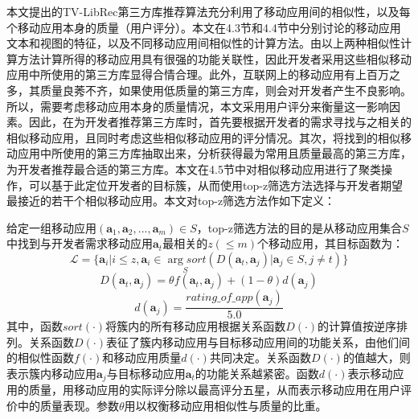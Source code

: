 本文提出的TV-LibRec第三方库推荐算法充分利用了移动应用间的相似性，以及每个移动应用本身的质量（用户评分）。本文在4.3节和4.4节中分别讨论的移动应用文本和视图的特征，以及不同移动应用间相似性的计算方法。由以上两种相似性计算方法计算所得的移动应用具有很强的功能关联性，因此开发者采用这些相似移动应用中所使用的第三方库显得合情合理。此外，互联网上的移动应用有上百万之多，其质量良莠不齐，如果使用低质量的第三方库，则会对开发者产生不良影响。所以，需要考虑移动应用本身的质量情况，本文采用用户评分来衡量这一影响因素。因此，在为开发者推荐第三方库时，首先要根据开发者的需求寻找与之相关的相似移动应用，且同时考虑这些相似移动应用的评分情况。其次，将找到的相似移动应用中所使用的第三方库抽取出来，分析获得最为常用且质量最高的第三方库，为开发者推荐最合适的第三方库。本文在4.5节中对相似移动应用进行了聚类操作，可以基于此定位开发者的目标簇，从而使用top-z筛选方法选择与开发者期望最接近的若干个相似移动应用。本文对top-z筛选方法作如下定义：
\begin{definition}
给定一组移动应用$(\mathbf{a}_1, \mathbf{a}_2, ..., \mathbf{a}_m) \in S$，top-z筛选方法的目的是从移动应用集合$S$中找到与开发者需求移动应用$\mathbf{a}_t$最相关的$z(\leq m)$个移动应用，其目标函数为：
\begin{equation}
\mathcal{L} = \{\mathbf{a}_i | i \leq z, \mathbf{a}_i \in \underset{S}{\arg sort} (D(\mathbf{a}_t, \mathbf{a}_j) | \mathbf{a}_j \in S, j \neq t)\}
\end{equation}
\begin{equation}
D(\mathbf{a}_t, \mathbf{a}_j) = \theta f(\mathbf{a}_t, \mathbf{a}_j) +  (1-\theta) d(\mathbf{a}_j)
\end{equation}
\begin{equation}
d(\mathbf{a}_j) = \frac{rating\_of\_app(\mathbf{a}_j)}{5.0}
\end{equation}
其中，函数$sort(\cdot)$将簇内的所有移动应用根据关系函数$D(\cdot)$的计算值按逆序排列。关系函数$D(\cdot)$表征了簇内移动应用与目标移动应用间的功能关系，由他们间的相似性函数$f(\cdot)$和移动应用质量$d(\cdot)$共同决定。关系函数$D(\cdot)$的值越大，则表示簇内移动应用$\mathbf{a}_j$与目标移动应用$\mathbf{a}_t$的功能关系越紧密。函数$d(\cdot)$表示移动应用的质量，用移动应用的实际评分除以最高评分五星，从而表示移动应用在用户评价中的质量表现。参数$\theta$用以权衡移动应用相似性与质量的比重。
\end{definition}

